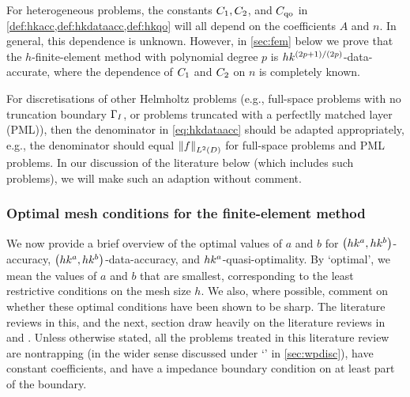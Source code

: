 \label{rem:accuracyhetero}
For heterogeneous problems, the constants $C_{1}, C_{2}$, and $C_{\mathrm{qo}}$ in \cref{def:hkacc,def:hkdataacc,def:hkqo} will all depend on the coefficients $A$ and $n.$ In general, this dependence is unknown. However, in \cref{sec:fem} below we prove that the $h$-finite-element method with polynomial degree $p$ is $hk^{(2p+1)/(2p)}$-data-accurate, where the dependence of $C_{1}$ and $C_{2}$ on $n$ is completely known.
\ere

For discretisations of other Helmholtz problems (e.g., full-space problems with no truncation boundary $\Gamma_{I}$, or problems truncated with a perfectlly matched layer (PML)), then the denominator in \cref{eq:hkdataacc} should be adapted appropriately, e.g., the denominator should equal $\NLtD{f}$ for full-space problems and PML problems. In our discussion of the literature below (which includes such problems), we will make such an adaption without comment.
\ere




\subsubsection{Optimal mesh conditions for the finite-element method}

We now provide a brief overview of the optimal values of $a$ and $b$ for $\hk{a}{b}$-accuracy, $\hk{a}{b}$-data-accuracy, and $hk^{a}$-quasi-optimality. By `optimal', we mean the values of $a$ and $b$ that are smallest, corresponding to the least restrictive conditions on the mesh size $h$. We also, where possible, comment on whether these optimal conditions have been shown to be sharp. The literature reviews in this, and the next, section draw heavily on the literature reviews in \cite[pp. 182--183]{GrLoMeSp:14} and \cite[p. 112]{DiMoSp:19}. Unless otherwise stated, all the problems treated in this literature review are nontrapping (in the wider sense discussed under `\techtitle' in \cref{sec:wpdisc}), have constant coefficients, and have a impedance boundary condition on at least part of the boundary.

